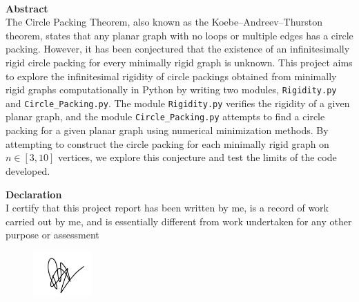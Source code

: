 ~\vspace{\fill}

\thispagestyle{empty}
\begin{center}
    \textbf{Abstract}\\


    \justifying
    \noindent
    The Circle Packing Theorem, also known as the Koebe–Andreev–Thurston theorem, states that any planar graph with no loops or multiple edges has a circle packing. However, it has been conjectured that the existence of an infinitesimally rigid circle packing for every minimally rigid graph is unknown. This project aims to explore the infinitesimal rigidity of circle packings obtained from minimally rigid graphs computationally in Python by writing two modules, \texttt{Rigidity.py} and \texttt{Circle\_Packing.py}. The module \texttt{Rigidity.py} verifies the rigidity of a given planar graph, and the module \texttt{Circle\_Packing.py} attempts to find a circle packing for a given planar graph using numerical minimization methods. By attempting to construct the circle packing for each minimally rigid graph on $n \in [3,10]$ vertices, we explore this conjecture and test the limits of the code developed.


\end{center}    

\vspace{2cm}

\begin{center}
    
    \textbf{Declaration} \\
    \justifying
    \noindent
    {I certify that this project report has been written by me, is a record of work carried out by me, and is essentially different from work undertaken for any other purpose or assessment}
\end{center}
\vspace{-8mm}
\begin{figure}[htbp]
    \begin{flushright}
        \includegraphics[width = 0.2\textwidth]{Signature.png}    
    \end{flushright}
    
\end{figure}

\vspace{\fill}
\restoregeometry
\clearpage

\tableofcontents*

\clearpage
